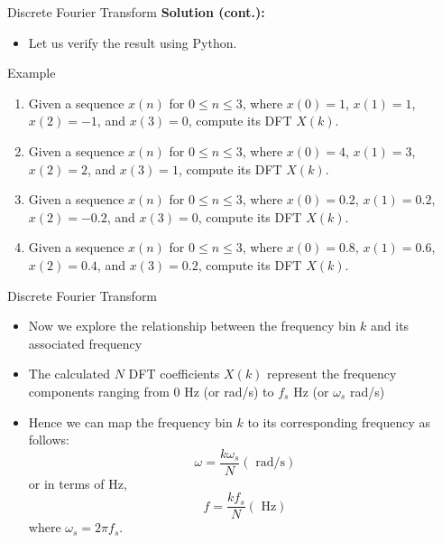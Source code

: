 \documentclass[pdflatex,compress,mathserif]{beamer}
\begin{document}
\begin{frame}[fragile]{Discrete Fourier Transform}
    \textbf{Solution (cont.):}
    \begin{itemize}
        \item Let us verify the result using Python.
    \end{itemize}
\end{frame}

\begin{frame}{Example}

    \begin{enumerate}
        \item Given a sequence $x(n)$ for $0 \leq n \leq 3$, where $x(0)=1$, $x(1)=1$, $x(2)=-1$, and $x(3)=0$, compute its DFT $X(k)$.
        \item Given a sequence $x(n)$ for $0 \leq n \leq 3$, where $x(0)=4$, $x(1)=3$, $x(2)=2$, and $x(3)=1$, compute its DFT $X(k)$.
        \item Given a sequence $x(n)$ for $0 \leq n \leq 3$, where $x(0)=0.2$, $x(1)=0.2$, $x(2)=-0.2$, and $x(3)=0$, compute its DFT $X(k)$.
        \item Given a sequence $x(n)$ for $0 \leq n \leq 3$, where $x(0)=0.8$, $x(1)=0.6$, $x(2)=0.4$, and $x(3)=0.2$, compute its DFT $X(k)$.
    \end{enumerate}
\end{frame}

\begin{frame}{Discrete Fourier Transform}
    \begin{itemize}
        \item Now we explore the relationship between the frequency bin $k$ and its associated frequency
        \item The calculated $N$ DFT coefficients $X(k)$ represent the frequency components ranging from 0 Hz (or rad/s) to $f_s$ Hz (or $\omega_s$ rad/s)
        \item Hence we can map the frequency bin $k$ to its corresponding frequency as follows:
        \begin{equation}
            \omega = \frac{k \omega_s}{N} (\text{ rad/s})
            \label{eq:4.17}
        \end{equation}
        or in terms of Hz,
        \begin{equation}
            f = \frac{k f_s}{N} (\text{ Hz})
            \label{eq:4.18}
        \end{equation}
        where $\omega_s = 2 \pi f_s$.
    \end{itemize}
\end{frame}
\end{document}
